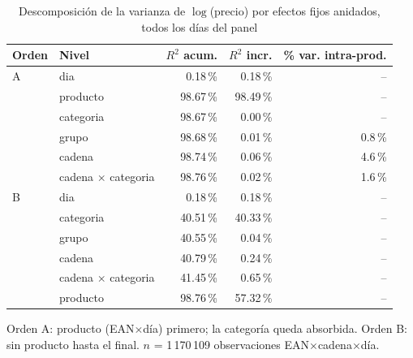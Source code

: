 \begin{table}[htbp]
\caption{Descomposici\'on de la varianza de $\log$(precio) por efectos fijos anidados, todos los d\'ias del panel}
\label{tab:varianza}
\centering\scriptsize\setlength{\tabcolsep}{3pt}
\begin{tabular}{@{}llrrr@{}}
\toprule
Orden & Nivel & $R^2$ acum. & $R^2$ incr. & \% var. intra-prod. \\
\midrule
A & dia & 0.18\,\% & 0.18\,\% & -- \\
 & producto & 98.67\,\% & 98.49\,\% & -- \\
 & categoria & 98.67\,\% & 0.00\,\% & -- \\
 & grupo & 98.68\,\% & 0.01\,\% & 0.8\,\% \\
 & cadena & 98.74\,\% & 0.06\,\% & 4.6\,\% \\
 & cadena $\times$ categoria & 98.76\,\% & 0.02\,\% & 1.6\,\% \\
\midrule
B & dia & 0.18\,\% & 0.18\,\% & -- \\
 & categoria & 40.51\,\% & 40.33\,\% & -- \\
 & grupo & 40.55\,\% & 0.04\,\% & -- \\
 & cadena & 40.79\,\% & 0.24\,\% & -- \\
 & cadena $\times$ categoria & 41.45\,\% & 0.65\,\% & -- \\
 & producto & 98.76\,\% & 57.32\,\% & -- \\
\bottomrule\end{tabular}
\par\smallskip\raggedright\scriptsize Orden A: producto (EAN$\times$d\'ia) primero; la categor\'ia queda absorbida. Orden B: sin producto hasta el final. $n$ = 1\,170\,109 observaciones EAN$\times$cadena$\times$d\'ia.
\end{table}
